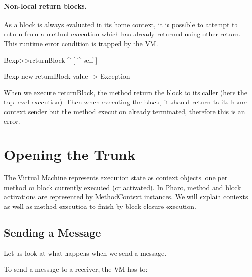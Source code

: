 \documentclass[a4paper,10pt,twoside]{book}
\begin{document}
\paragraph{Non-local return blocks.} As a block is always evaluated in its home context, it is possible to attempt to return from a method execution which has already returned using other return. This runtime error condition is trapped by the VM.


\begin{code}{}
Bexp>>returnBlock
	^ [ ^ self ]

Bexp new returnBlock value
-> Exception
\end{code}

When we execute returnBlock, the method return the block to its caller (here the top level execution). Then when executing the block, it should return to its home context sender but the method execution already terminated, therefore this is an error.




\section{Opening the Trunk}

The Virtual Machine represents execution state as context objects, one per method or block currently executed (or activated). In Pharo, method and block activations are represented by MethodContext instances.
We will explain contexts as well as method execution to finish by block closure execution.




\subsection{Sending a Message}
Let us look at what happens when we send a message.





To send a message to a receiver, the VM has to:
\end{document}
